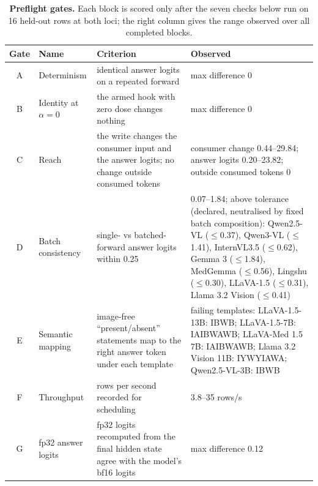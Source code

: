 \begin{table}[h]
\centering
\scriptsize
\setlength{\tabcolsep}{4pt}
\caption{\textbf{Preflight gates.} Each block is scored only after the seven checks below run on 16 held-out rows at both loci; the right column gives the range observed over all completed blocks.}
\label{tab:cf-gates}
\begin{tabular}{clp{4.3cm}p{6.0cm}}
\toprule
Gate & Name & Criterion & Observed \\
\midrule
A & Determinism & identical answer logits on a repeated forward & max difference 0 \\
B & Identity at $\alpha=0$ & the armed hook with zero dose changes nothing & max difference 0 \\
C & Reach & the write changes the consumer input and the answer logits; no change outside consumed tokens & consumer change 0.44--29.84; answer logits 0.20--23.82; outside consumed tokens 0 \\
D & Batch consistency & single- vs batched-forward answer logits within 0.25 & 0.07--1.84; above tolerance (declared, neutralised by fixed batch composition): Qwen2.5-VL ($\leq$0.37), Qwen3-VL ($\leq$1.41), InternVL3.5 ($\leq$0.62), Gemma 3 ($\leq$1.84), MedGemma ($\leq$0.56), Lingshu ($\leq$0.30), LLaVA-1.5 ($\leq$0.31), Llama 3.2 Vision ($\leq$0.41) \\
E & Semantic mapping & image-free ``present/absent'' statements map to the right answer token under each template & failing templates: LLaVA-1.5-13B: IBWB; LLaVA-1.5-7B: IAIBWAWB; LLaVA-Med 1.5 7B: IAIBWAWB; Llama 3.2 Vision 11B: IYWYIAWA; Qwen2.5-VL-3B: IBWB \\
F & Throughput & rows per second recorded for scheduling & 3.8--35 rows/s \\
G & fp32 answer logits & fp32 logits recomputed from the final hidden state agree with the model's bf16 logits & max difference 0.12 \\
\bottomrule
\end{tabular}
\end{table}
